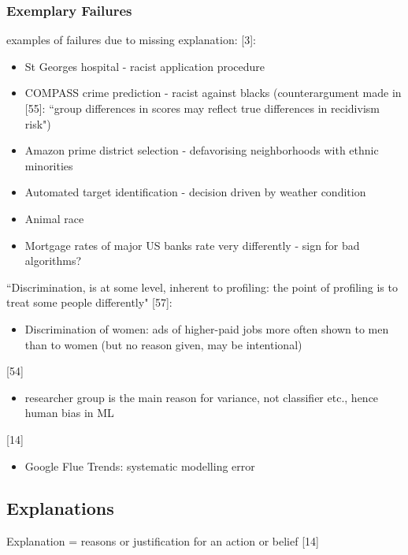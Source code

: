 \subsubsection{Exemplary Failures}
examples of failures due to missing explanation:
[3]:
\begin{itemize}
	\item St Georges hospital - racist application procedure 
	\item COMPASS crime prediction - racist against blacks (counterargument made in [55]: ``group differences in scores may reflect true differences in recidivism risk")
	\item Amazon prime district selection - defavorising neighborhoods with ethnic minorities
	\item Automated target identification - decision driven by weather condition
	\item Animal race 
	\item Mortgage rates of major US banks rate very differently - sign for bad algorithms?
\end{itemize}
``Discrimination, is at some level, inherent to profiling: the point of profiling is to treat some people differently" [57]:
\begin{itemize}
	\item Discrimination of women: ads of higher-paid jobs more often shown to men than to women (but no reason given, may be intentional)
\end{itemize}
[54]
\begin{itemize}
	\item researcher group is the main reason for variance, not classifier etc., hence human bias in ML
\end{itemize}
[14]
\begin{itemize}
	\item Google Flue Trends: systematic modelling error 
\end{itemize}







\subsection{Explanations}
Explanation = reasons or justification for an action or belief [14]\newline

